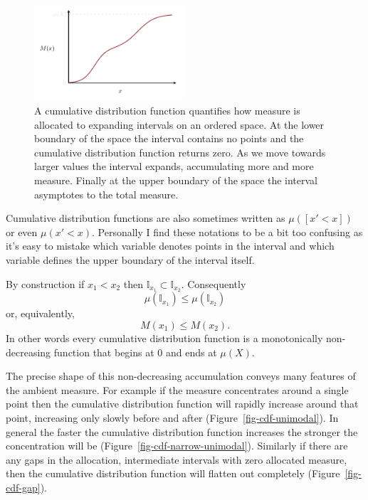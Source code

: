 \documentclass[
  letterpaper,
  DIV=11,
  numbers=noendperiod]{scrartcl}
\begin{document}
\begin{figure}

{\centering \includegraphics[width=0.5\textwidth,height=\textheight]{figures/cdfs/cdf/cdf.pdf}

}

\caption{\label{fig-cdf-basics}A cumulative distribution function
quantifies how measure is allocated to expanding intervals on an ordered
space. At the lower boundary of the space the interval contains no
points and the cumulative distribution function returns zero. As we move
towards larger values the interval expands, accumulating more and more
measure. Finally at the upper boundary of the space the interval
asymptotes to the total measure.}

\end{figure}

Cumulative distribution functions are also sometimes written as
\(\mu([x' < x])\) or even \(\mu(x' < x)\). Personally I find these
notations to be a bit too confusing as it's easy to mistake which
variable denotes points in the interval and which variable defines the
upper boundary of the interval itself.

By construction if \(x_{1} < x_{2}\) then
\(\mathbb{I}_{x_{1}} \subset \mathbb{I}_{x_{2}}\). Consequently \[
\mu(\mathbb{I}_{x_{1}}) \le \mu(\mathbb{I}_{x_{2}})
\] or, equivalently, \[
M(x_{1}) \le M(x_{2}).
\] In other words every cumulative distribution function is a
monotonically non-decreasing function that begins at \(0\) and ends at
\(\mu(X)\).

The precise shape of this non-decreasing accumulation conveys many
features of the ambient measure. For example if the measure concentrates
around a single point then the cumulative distribution function will
rapidly increase around that point, increasing only slowly before and
after (Figure~\ref{fig-cdf-unimodal}). In general the faster the
cumulative distribution function increases the stronger the
concentration will be (Figure~\ref{fig-cdf-narrow-unimodal}). Similarly
if there are any gaps in the allocation, intermediate intervals with
zero allocated measure, then the cumulative distribution function will
flatten out completely (Figure~\ref{fig-cdf-gap}).
\end{document}

